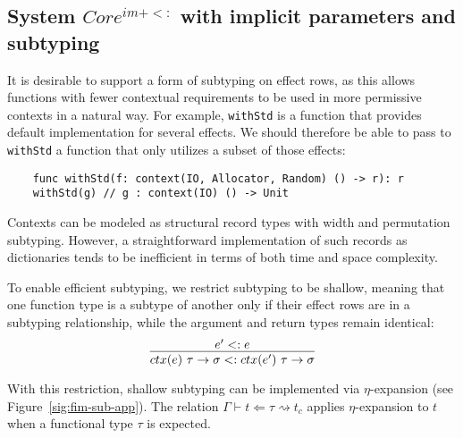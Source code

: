 \documentclass[acmsmall]{acmart}
\newcommand{\ctx}[1]{ctx(#1)~}
\newcommand{\step}{\rightsquigarrow}
\begin{document}

\subsection{System $Core^{im+<:}$ with implicit parameters and subtyping} \label{subsec:im-sub}

It is desirable to support a form of subtyping on effect rows, as this allows functions with fewer contextual requirements to be used in more permissive contexts in a natural way.
For example, \texttt{withStd} is a function that provides default implementation for several effects.
We should therefore be able to pass to \texttt{withStd} a function that only utilizes a subset of those effects:
\begin{verbatim}
    func withStd(f: context(IO, Allocator, Random) () -> r): r
    withStd(g) // g : context(IO) () -> Unit
\end{verbatim}

Contexts can be modeled as structural record types with width and permutation subtyping.
However, a straightforward implementation of such records as dictionaries tends to be inefficient in terms of both time and space complexity.

To enable efficient subtyping, we restrict subtyping to be shallow, meaning that one function type is a subtype of another only if their effect rows are in a subtyping relationship, while the argument and return types remain identical:
\[
    \infer{\ctx{e} \tau \to \sigma <: \ctx{e'} \tau\to\sigma}{e' <: e}
\]

With this restriction, shallow subtyping can be implemented via $\eta$-expansion (see Figure~\ref{sig:fim-sub-app}).
The relation $\Gamma\vdash t\Leftarrow \tau \step t_c$ applies $\eta$-expansion to $t$ when a functional type $\tau$ is expected.
\end{document}

